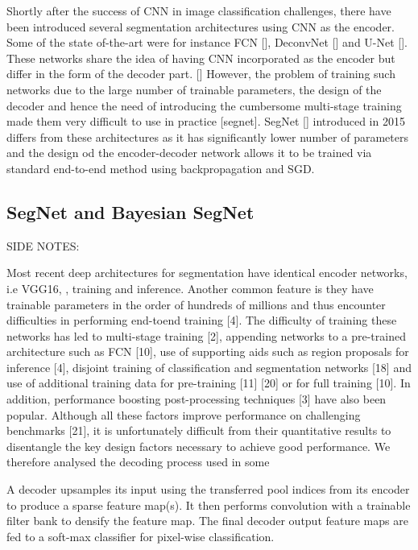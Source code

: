 Shortly after the success of CNN in image classification challenges, there have been introduced several segmentation architectures using CNN as the encoder. Some of the state of-the-art were for instance FCN [], DeconvNet [] and U-Net []. These networks share the idea of having CNN incorporated as the encoder but differ in the form
of the decoder part. [] However, the problem of training such networks due to the large number of trainable parameters, the design of the decoder and hence the need of introducing the cumbersome multi-stage training made them very difficult to use in practice [segnet]. SegNet [] introduced in 2015 differs from these architectures as it has significantly lower number of parameters and the design od the encoder-decoder network allows it to be trained via standard end-to-end method using backpropagation and SGD. 

\subsection{SegNet and Bayesian SegNet}





\newpage
\newpage



SIDE NOTES:


Most recent deep architectures for segmentation have
identical encoder networks, i.e VGG16, , training and inference. Another common
feature is they have trainable parameters in the order of hundreds
of millions and thus encounter difficulties in performing end-toend training [4]. The difficulty of training these networks has led
to multi-stage training [2], appending networks to a pre-trained
architecture such as FCN [10], use of supporting aids such as
region proposals for inference [4], disjoint training of classification
and segmentation networks [18] and use of additional training data
for pre-training [11] [20] or for full training [10]. In addition,
performance boosting post-processing techniques [3] have also
been popular. Although all these factors improve performance on
challenging benchmarks [21], it is unfortunately difficult from
their quantitative results to disentangle the key design factors
necessary to achieve good performance. We therefore analysed
the decoding process used in some

A decoder upsamples its
input using the transferred pool indices from its encoder to produce a sparse feature map(s). It then performs convolution with a trainable filter bank
to densify the feature map. The final decoder output feature maps are fed to a soft-max classifier for pixel-wise classification.


